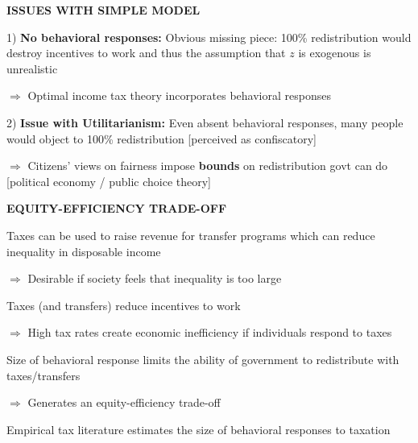 \documentclass[landscape]{slides}
\begin{document}
\begin{slide}
\begin{center}
{\bf ISSUES WITH SIMPLE MODEL}
\end{center}

1) {\bf No behavioral responses:} Obvious missing piece: 100\%
redistribution would destroy incentives to work and thus the
assumption that $z$ is exogenous is unrealistic

$\Rightarrow$ Optimal income tax theory incorporates behavioral
responses

2) {\bf Issue with Utilitarianism:} Even absent behavioral
responses, many people would object to 100\% redistribution
[perceived as confiscatory]

$\Rightarrow$ Citizens' views on fairness impose {\bf bounds} on
redistribution govt can do [political economy / public choice
theory]
\end{slide}

%
%
%
%
%


\begin{slide}
\begin{center}
{\bf EQUITY-EFFICIENCY TRADE-OFF}
\end{center}

Taxes can be used to raise revenue for transfer programs which can
reduce inequality in disposable income 

$\Rightarrow$ Desirable if
society feels that inequality is too large

Taxes (and transfers) reduce incentives to work 

$\Rightarrow$ High
tax rates create economic inefficiency if individuals respond to
taxes

Size of behavioral response limits the ability of government to
redistribute with taxes/transfers

$\Rightarrow$ Generates an equity-efficiency trade-off

Empirical tax literature estimates the size of behavioral
responses to taxation
\end{slide}
\end{document}
